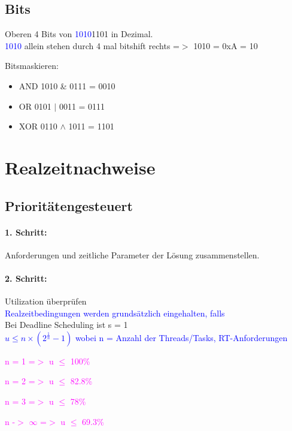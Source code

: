 \documentclass[12pt,a4paper,oneside,ngerman]{article}
\begin{document}
\subsection{Bits}
Oberen 4 Bits von \textcolor{blue}{1010}1101 in Dezimal. \\
\textcolor{blue}{1010} allein stehen durch 4 mal bitshift rechts =$>$ 1010 = 0xA = 10

Bitsmaskieren:
\begin{itemize}
	\item AND 1010 \& 0111 = 0010
	\item OR 0101 $|$ 0011 = 0111
	\item XOR 0110 $\wedge$ 1011 = 1101
\end{itemize}

\section{Realzeitnachweise}
\subsection{Prioritätengesteuert}

\paragraph{1. Schritt:}
Anforderungen und zeitliche Parameter der Lösung zusammenstellen.
\paragraph{2. Schritt:}
Utilization überprüfen\\
\textcolor{blue}{Realzeitbedingungen werden grundsätzlich eingehalten, falls}\\

Bei Deadline Scheduling ist s = 1\\

\textcolor{blue}{\(u \leq n\times( 2^\frac{1}{n} - 1)\) wobei n = Anzahl der Threads/Tasks, RT-Anforderungen}
\begin{description}
	\item \textcolor{magenta}{n = 1 =$>$ u \(\leq\) 100\%}
	\item \textcolor{magenta}{n = 2 =$>$ u \(\leq\) 82.8\%}
	\item \textcolor{magenta}{n = 3 =$>$ u \(\leq\) 78\%}
	\item \textcolor{magenta}{n -$>$ $\infty$ =$>$ u \(\leq\) 69.3\%}
\end{description}
\end{document}
